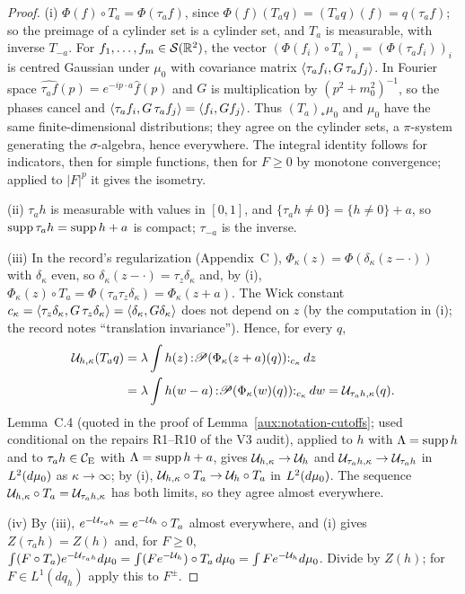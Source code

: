 \begin{proof}
(i) $\Phi(f)\circ T_a=\Phi(\tau_af)$, since $\Phi(f)(T_aq)=(T_aq)(f)=q(\tau_af)$; so the
preimage of a cylinder set is a cylinder set, and $T_a$ is measurable, with inverse $T_{-a}$.
For $f_1,\dots,f_m\in\mathcal S(\mathbb{R}^2)$, the vector $(\Phi(f_i)\circ T_a)_i=(\Phi(\tau_af_i))_i$
is centred Gaussian under $\mu_0$ with covariance matrix $\langle \tau_af_i,G\,\tau_af_j\rangle$.  In
Fourier space $\widehat{\tau_af}(p)=e^{-ip\cdot a}\hat f(p)$ and $G$ is multiplication by
$(p^2+m_0^2)^{-1}$, so the phases cancel and $\langle \tau_af_i,G\,\tau_af_j\rangle=\langle f_i,Gf_j\rangle$.
Thus $(T_a)_*\mu_0$ and $\mu_0$ have the same finite-dimensional distributions; they agree on
the cylinder sets, a $\pi$-system generating the $\sigma$-algebra, hence everywhere.  The
integral identity follows for indicators, then for simple functions, then for $F\ge0$ by
monotone convergence; applied to $|F|^p$ it gives the isometry.

(ii) $\tau_ah$ is measurable with values in $[0,1]$, and $\{\tau_ah\ne0\}=\{h\ne0\}+a$, so
$\operatorname{supp}\tau_ah=\operatorname{supp} h+a$ is compact; $\tau_{-a}$ is the inverse.

(iii) In the record's regularization (Appendix~C \cite[pp.~39--40]{R}),
$\Phi_\kappa(z)=\Phi(\delta_\kappa(z-\cdot))$ with $\delta_\kappa$ even, so
$\delta_\kappa(z-\cdot)=\tau_z\delta_\kappa$ and, by (i),
$\Phi_\kappa(z)\circ T_a=\Phi(\tau_a\tau_z\delta_\kappa)=\Phi_\kappa(z+a)$.  The Wick constant
$c_\kappa=\langle \tau_z\delta_\kappa,G\,\tau_z\delta_\kappa\rangle=\langle \delta_\kappa,G\delta_\kappa\rangle$
does not depend on $z$ (by the computation in (i); the record notes ``translation
invariance'').  Hence, for every $q$,
\begin{align*}
 \mathcal U_{h,\kappa}(T_aq)&=\lambda\int h(z)\,{:}\mathscr P(\Phi_\kappa(z+a)(q)){:}_{c_\kappa}\,dz\\
 &=\lambda\int h(w-a)\,{:}\mathscr P(\Phi_\kappa(w)(q)){:}_{c_\kappa}\,dw
 =\mathcal U_{\tau_ah,\kappa}(q) .
\end{align*}
Lemma~C.4 \cite[p.~40]{R} (quoted in the proof of Lemma~\ref{aux:notation-cutoffs}; used
conditional on the repairs R1--R10 of the V3 audit), applied to $h$ with $\Lambda=\operatorname{supp} h$ and
to $\tau_ah\in\mathcal{C}_{\mathrm E}$ with $\Lambda=\operatorname{supp} h+a$, gives
$\mathcal U_{h,\kappa}\to\mathcal U_h$ and $\mathcal U_{\tau_ah,\kappa}\to\mathcal U_{\tau_ah}$ in $L^2(d\mu_0)$ as
$\kappa\to\infty$; by (i), $\mathcal U_{h,\kappa}\circ T_a\to\mathcal U_h\circ T_a$ in $L^2(d\mu_0)$.  The
sequence $\mathcal U_{h,\kappa}\circ T_a=\mathcal U_{\tau_ah,\kappa}$ has both limits, so they agree almost
everywhere.

(iv) By (iii), $e^{-\mathcal U_{\tau_ah}}=e^{-\mathcal U_h}\circ T_a$ almost everywhere, and (i) gives
$Z(\tau_ah)=Z(h)$ and, for $F\ge0$, $\int(F\circ T_a)e^{-\mathcal U_{\tau_ah}}d\mu_0=\int(F
e^{-\mathcal U_h})\circ T_a\,d\mu_0=\int Fe^{-\mathcal U_h}d\mu_0$.  Divide by $Z(h)$; for $F\in L^1(dq_h)$
apply this to $F^\pm$.
\end{proof}

